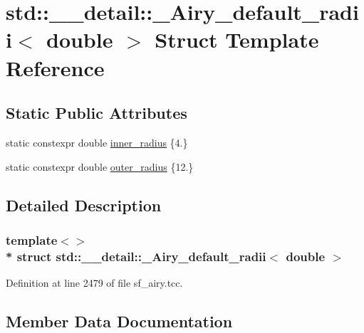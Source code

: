 \hypertarget{structstd_1_1____detail_1_1__Airy__default__radii_3_01double_01_4}{}\section{std\+:\+:\+\_\+\+\_\+detail\+:\+:\+\_\+\+Airy\+\_\+default\+\_\+radii$<$ double $>$ Struct Template Reference}
\label{structstd_1_1____detail_1_1__Airy__default__radii_3_01double_01_4}
\subsection*{Static Public Attributes}
\begin{DoxyCompactItemize}
\item 
static constexpr double \hyperlink{structstd_1_1____detail_1_1__Airy__default__radii_3_01double_01_4_a1c16ae812de7fce0a39bc3b094767b87}{inner\+\_\+radius} \{4.\}
\item 
static constexpr double \hyperlink{structstd_1_1____detail_1_1__Airy__default__radii_3_01double_01_4_a0d0c981d84c034afb18aa533bd6a9a52}{outer\+\_\+radius} \{12.\}
\end{DoxyCompactItemize}


\subsection{Detailed Description}
\subsubsection*{template$<$$>$\\*
struct std\+::\+\_\+\+\_\+detail\+::\+\_\+\+Airy\+\_\+default\+\_\+radii$<$ double $>$}



Definition at line 2479 of file sf\+\_\+airy.\+tcc.



\subsection{Member Data Documentation}
